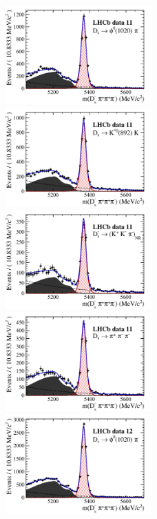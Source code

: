 \begin{figure}[h]
\includegraphics[height=!,width=0.5\textwidth]{figs/norm_y11_phipi.pdf}
\includegraphics[height=!,width=0.5\textwidth]{figs/norm_y11_KsK.pdf}
\includegraphics[height=!,width=0.5\textwidth]{figs/norm_y11_KKpi_NR.pdf}
\includegraphics[height=!,width=0.5\textwidth]{figs/norm_y11_pipipi.pdf}
\includegraphics[height=!,width=0.5\textwidth]{figs/norm_y12_phipi.pdf}

\end{figure}
